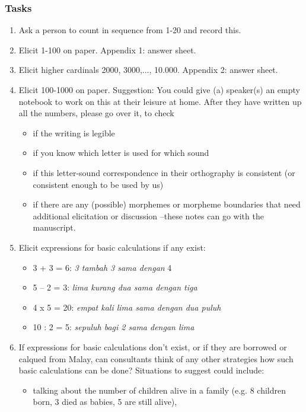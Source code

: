\subsubsection*{Tasks}
\begin{enumerate}
\item Ask a person to count in sequence from 1-20 and record this.
\item Elicit 1-100 on paper. Appendix 1: answer sheet.
\item Elicit higher cardinals 2000, 3000,..., 10.000. Appendix 2: answer sheet. 
\item Elicit 100-1000 on paper. Suggestion: You could give (a) speaker(s) an empty  notebook to work on this at their leisure at home. After they have written up all the numbers, please go over it, to check   
  \begin{itemize}
  \item if the writing is legible 
  \item if you know which letter is used for which sound
  \item if this letter-sound correspondence in their orthography is consistent (or consistent enough to be used by us) 
  \item if there are any (possible) morphemes or morpheme boundaries that need additional elicitation or discussion --these notes can go with the manuscript.
  \end{itemize}
\item Elicit expressions for basic calculations if any exist: 
  \begin{itemize}
  \item 3 + 3 = 6: \textit{3 tambah 3 sama dengan} 4
  \item 5 -- 2 = 3: \textit{lima kurang dua sama dengan tiga}
  \item 4 x 5 = 20: \textit{empat kali lima sama dengan dua puluh}
  \item 10 : 2 = 5: \textit{sepuluh bagi 2 sama dengan lima} 
  \end{itemize}
\item If expressions for basic calculations don't exist, or if they are borrowed or calqued from Malay, can consultants think of any other strategies how such basic calculations can be done? Situations to suggest could include: 
  \begin{itemize}
  \item talking about the number of children alive in a family (e.g. 8 children born, 3 died as babies, 5 are still alive), 

\end{itemize}
\end{enumerate}
